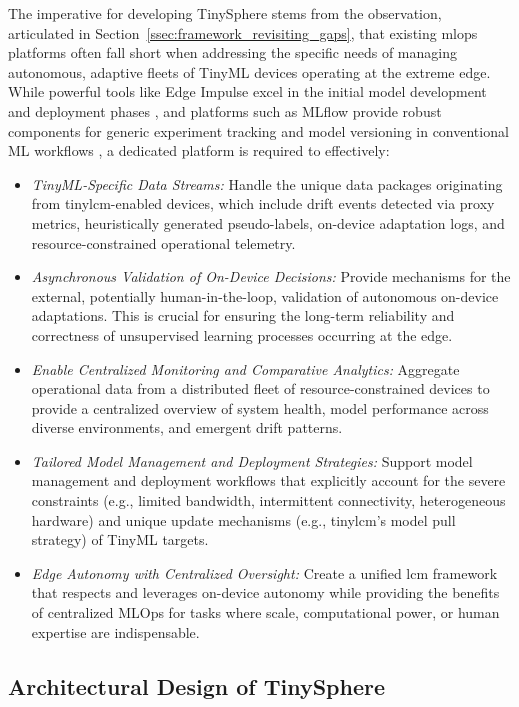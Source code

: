 The imperative for developing TinySphere stems from the observation, articulated in Section~\ref{ssec:framework_revisiting_gaps}, that existing \gls{mlops} platforms often fall short when addressing the specific needs of managing autonomous, adaptive fleets of TinyML devices operating at the extreme edge. While powerful tools like Edge Impulse excel in the initial model development and deployment phases \cite{banburyEdgeImpulseMLOps2023}, and platforms such as MLflow provide robust components for generic experiment tracking and model versioning in conventional ML workflows \cite{condeEnhancedFIWAREBasedArchitecture2024}, a dedicated platform is required to effectively:
\begin{itemize}
    \item \textit{TinyML-Specific Data Streams:} Handle the unique data packages originating from \gls{tinylcm}-enabled devices, which include drift events detected via proxy metrics, heuristically generated pseudo-labels, on-device adaptation logs, and resource-constrained operational telemetry.
    \item \textit{Asynchronous Validation of On-Device Decisions:} Provide mechanisms for the external, potentially human-in-the-loop, validation of autonomous on-device adaptations. This is crucial for ensuring the long-term reliability and correctness of unsupervised learning processes occurring at the edge.
    \item \textit{Enable Centralized Monitoring and Comparative Analytics:} Aggregate operational data from a distributed fleet of resource-constrained devices to provide a centralized overview of system health, model performance across diverse environments, and emergent drift patterns.
    \item \textit{Tailored Model Management and Deployment Strategies:} Support model management and deployment workflows that explicitly account for the severe constraints (e.g., limited bandwidth, intermittent connectivity, heterogeneous hardware) and unique update mechanisms (e.g., \gls{tinylcm}'s model pull strategy) of TinyML targets.
    \item \textit{Edge Autonomy with Centralized Oversight:} Create a unified \gls{lcm} framework that respects and leverages on-device autonomy while providing the benefits of centralized MLOps for tasks where scale, computational power, or human expertise are indispensable.
\end{itemize}

\subsection{Architectural Design of TinySphere}
\label{ssec:tinysphere_architecture}

